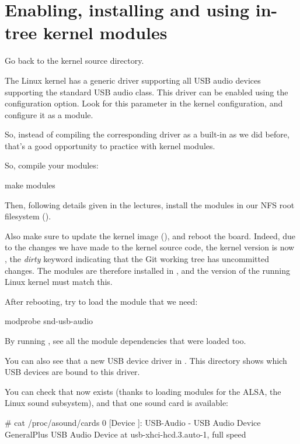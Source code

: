 \section{Enabling, installing and using in-tree kernel modules}

Go back to the kernel source directory.

The Linux kernel has a generic driver supporting all USB audio devices
supporting the standard USB audio class. This driver can be enabled
using the  configuration option. Look
for this parameter in the kernel configuration, and configure it
as a module.

So, instead of compiling the corresponding driver as a built-in as
we did before, that's a good opportunity to practice with kernel modules.

So, compile your modules:
\begin{bashinput}
make modules
\end{bashinput}

Then, following details given in the lectures, install the modules in our NFS
root filesystem ().

Also make sure to update the kernel image (), and reboot the
board.  Indeed, due to the changes we have made to the kernel source code,
the kernel version is now , the {\em dirty}
keyword indicating that the Git working tree has uncommitted changes.
The modules are therefore installed in ,
and the version of the running Linux kernel must match this.

After rebooting, try to load the module that we need:

\begin{bashinput}
modprobe snd-usb-audio
\end{bashinput}

By running , see all the module dependencies that
were loaded too.

You can also see that a new USB device driver in
. This directory shows which
USB devices are bound to this driver.

You can check that  now exists (thanks to loading
modules for the ALSA, the Linux sound subsystem), and that one sound
card is available:

\begin{bashinput}
# cat /proc/asound/cards
 0 [Device         ]: USB-Audio - USB Audio Device
                      GeneralPlus USB Audio Device at usb-xhci-hcd.3.auto-1, full speed
\end{bashinput}

